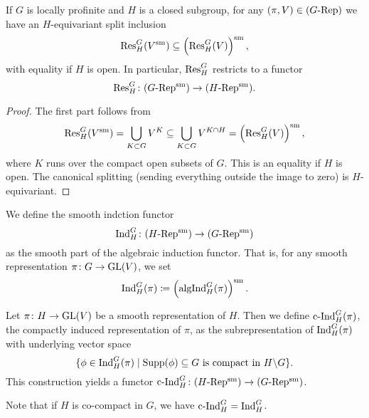 \documentclass[../main.tex]{subfiles}
\begin{document}
\begin{lem}\label{lem:SmoothRestriction}
  If $G$ is locally profinite and $H$ is a closed subgroup, for any 
  $(\pi,V) \in {({G}\text-\allowbreak\mathrm{Rep})}$ we have an $H$-equivariant split inclusion
  \begin{equation*}
    \mathrm{Res}_H^G (V^{\mathrm{sm}}) \subseteq \left( \mathrm{Res}_H^G (V) \right)^{\mathrm{sm}},
  \end{equation*}
  with equality if $H$ is open. 
  In particular, $\mathrm{Res}_H^G$ restricts to a functor
  \begin{equation*}
    \mathrm{Res}_H^G\colon {({G}\text-\allowbreak\mathrm{Rep^{\mathrm{sm}}})} \to {({H}\text-\allowbreak\mathrm{Rep^{\mathrm{sm}}})}.
  \end{equation*}
\begin{proof}
  The first part follows from
  \begin{equation*}
    \mathrm{Res}_H^G(V^{\mathrm{sm}}) = \bigcup_{K \subset G} V^K \subseteq \bigcup_{K \subset G}
    V^{K \cap H} = \left(\mathrm{Res}_H^G(V)\right)^{\mathrm{sm}},
  \end{equation*}
  where $K$ runs over the compact open subsets of $G$. This is an equality if
  $H$ is open. The canonical splitting (sending everything outside the image to 
  zero) is $H$-equivariant.
\end{proof}
\end{lem}

\begin{defi}\label{def:SmoothInduction}
  We define the smooth indction functor 
  $$\mathrm{Ind}_H^G\colon {({H}\text-\allowbreak\mathrm{Rep^{\mathrm{sm}}})} \to {({G}\text-\allowbreak\mathrm{Rep^{\mathrm{sm}}})}$$ 
  as the smooth part of the algebraic induction functor. That is, for any smooth
  representation $\pi\colon G \to \operatorname{GL}(V)$, we set
  \begin{equation*}
    \mathrm{Ind}_H^G(\pi) \coloneqq \left(\mathrm{algInd}_H^G(\pi)\right)^{\mathrm{sm}}.
  \end{equation*}
  \end{defi}

\begin{defi}\label{def:CompactInduction}
  Let $\pi\colon H \to \operatorname{GL}(V)$ be a smooth representation
  of $H$. Then we define $\mathrm{c\text{-}Ind}_H^G(\pi)$, the compactly induced representation
  of $\pi$, as the subrepresentation of $\mathrm{Ind}_H^G(\pi)$ with underlying vector
  space
  \begin{equation*}
    \{\phi \in \mathrm{Ind}_H^G(\pi) \mid \operatorname{Supp}(\phi) \subseteq G \text{ is compact in }
    H\backslash G\}.
  \end{equation*}
  This construction yields a functor $\mathrm{c\text{-}Ind}_H^G\colon {({H}\text-\allowbreak\mathrm{Rep^{\mathrm{sm}}})} \to {({G}\text-\allowbreak\mathrm{Rep^{\mathrm{sm}}})}$. 
\end{defi}
Note that if $H$ is co-compact in $G$, we have $\mathrm{c\text{-}Ind}_H^G = \mathrm{Ind}_H^G$. 
\end{document}
